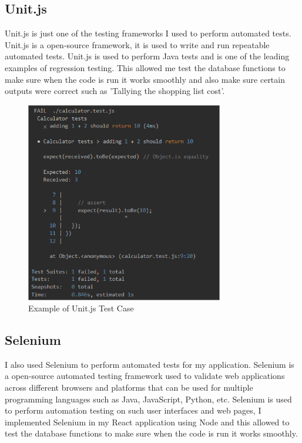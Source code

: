 \subsection{Unit.js}

Unit.js is just one of the testing frameworks I used to perform automated tests. Unit.js is a open-source framework, it is used to write and run repeatable automated tests. Unit.js is used to perform Java tests and is one of the leading examples of regression testing. This allowed me test the database functions to make sure when the code is run it works smoothly and also make sure certain outputs were correct such as 'Tallying the shopping list cost'.

\begin{figure}[H]
  \includegraphics[width=0.77\textwidth]{img/unitjs.png}
  \centering
  \caption{Example of Unit.js Test Case}
  \label{fig: Unit.js Test Case}
\end{figure}

\subsection{Selenium}

I also used Selenium to perform automated tests for my application. 
Selenium is a open-source automated testing framework used to validate web applications across different browsers and platforms that can be used for multiple programming languages such as Java, JavaScript, Python, etc. 
Selenium is used to perform automation testing on such user interfaces and web pages, I implemented Selenium in my React application using Node and this allowed to test the database functions to make sure when the code is run it works smoothly.

